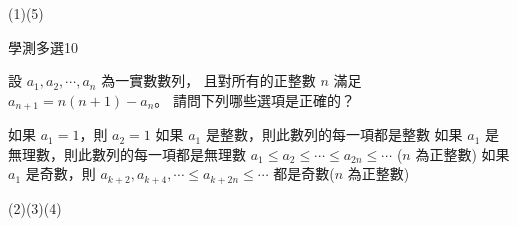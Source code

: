 \begin{QUESTIONS}
\begin{QUESTION}
\begin{QBODY}
        \end{QBODY}
        \begin{QFROMS}
        \end{QFROMS}
        \begin{QTAGS}\end{QTAGS}
        \begin{QANS}
            (1)(5)
        \end{QANS}
        \begin{QSOLLIST}
        \end{QSOLLIST}
        \begin{QEMPTYSPACE}
        \end{QEMPTYSPACE}
    \end{QUESTION}
    \begin{QUESTION}
        \begin{ExamInfo}{99}{學測}{多選}{10}
        \end{ExamInfo}
        \begin{ExamAnsRateInfo}{34}{53}{33}{16}
        \end{ExamAnsRateInfo}
        \begin{QBODY}
            設 $a_{1},a_{2},\cdots,a_{n}$ 為一實數數列，
			且對所有的正整數 $n$ 滿足 $a_{n+1} = n(n+1) - a_{n}$。
			請問下列哪些選項是正確的？
			\begin{QOPS} 
				\QOP 如果 $a_{1}=1$，則 $a_{2}=1$
				\QOP 如果 $a_{1}$ 是整數，則此數列的每一項都是整數
				\QOP 如果 $a_{1}$ 是無理數，則此數列的每一項都是無理數
				\QOP $a_{1} \leq a_{2} \leq  \cdots \leq a_{2n} \leq \cdots $ ($n$ 為正整數)
				\QOP 如果 $a_{1}$ 是奇數，則 
			$a_{k+2}, a_{k+4} ,  \cdots \leq a_{k+2n} \leq \cdots $ 都是奇數($n$ 為正整數)
			\end{QOPS}
        \end{QBODY}
        \begin{QFROMS}
        \end{QFROMS}
        \begin{QTAGS}\end{QTAGS}
        \begin{QANS}
            (2)(3)(4)
        \end{QANS}
        \begin{QSOLLIST}
        \end{QSOLLIST}
        \begin{QEMPTYSPACE}
        \end{QEMPTYSPACE}
    \end{QUESTION}

\end{QUESTIONS}
